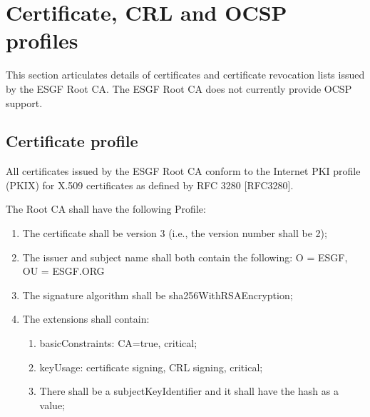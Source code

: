 \section{Certificate, CRL and OCSP profiles}\label{certificate-crl-and-ocsp-profiles}

This section articulates details of certificates and certificate
revocation lists issued by the ESGF Root CA. The ESGF Root CA
does not currently provide OCSP support.

\subsection{Certificate profile}\label{certificate-profile}

All certificates issued by the ESGF Root CA conform to the Internet
PKI profile (PKIX) for X.509 certificates as defined by RFC 3280
{[}RFC3280{]}.

The Root CA shall have the following Profile:

\begin{enumerate}
\item
  
  The certificate shall be version 3 (i.e., the version number shall be
  2);
  
\item
  
  The issuer and subject name shall both contain the following:
O = ESGF, OU = ESGF.ORG 
  
\item
  
  The signature algorithm shall be sha256WithRSAEncryption;
  
\item
  
  The extensions shall contain:
  

  \begin{enumerate}
  \item
    
    basicConstraints: CA=true, critical;
    
  \item
    
    keyUsage: certificate signing, CRL signing, critical;
    
  \item
    
    There shall be a subjectKeyIdentifier and it shall have the hash as a value;
    
  \end{enumerate}
\end{enumerate}

